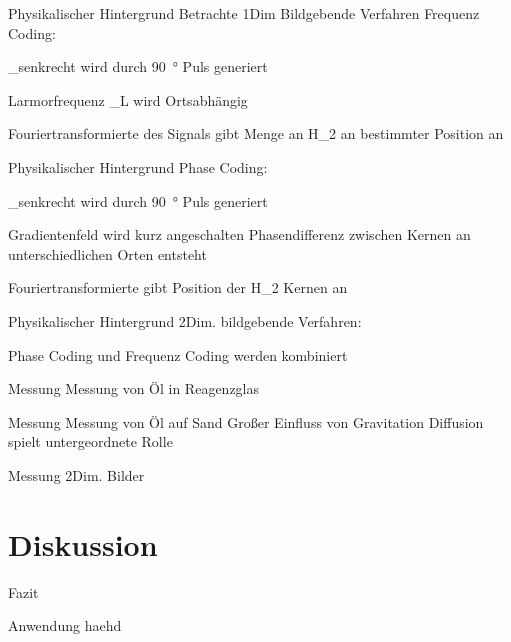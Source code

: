 \begin{frame}{Physikalischer Hintergrund}
Betrachte 1Dim Bildgebende Verfahren
Frequenz Coding:
	\item \M_{senkrecht} wird durch \SI{90}{\degree} Puls generiert
	\item Larmorfrequenz \omega_{L} wird Ortsabhängig
	\item Fouriertransformierte des Signals gibt Menge an H_{2} an bestimmter Position an
\end{frame}

\begin{frame}{Physikalischer Hintergrund}
Phase Coding:
	\item \M_{senkrecht} wird durch \SI{90}{\degree} Puls generiert
	\item Gradientenfeld wird kurz angeschalten
	\rightarrow Phasendifferenz zwischen Kernen an unterschiedlichen Orten entsteht
	\item Fouriertransformierte gibt Position der H_{2} Kernen an
\end{frame}

\begin{frame}{Physikalischer Hintergrund}
2Dim. bildgebende Verfahren:
	\item Phase Coding und Frequenz Coding werden kombiniert
\end{frame}

\begin{frame}{Messung}
Messung von Öl in Reagenzglas
\end{frame}

\begin{frame}{Messung}
Messung von Öl auf Sand
	\rightarrow Großer Einfluss von Gravitation
	\rightarrow Diffusion spielt untergeordnete Rolle
\end{frame}

\begin{frame}{Messung}
2Dim. Bilder
\end{frame}


\section{Diskussion}
\begin{frame}{Fazit}
\end{frame}

\begin{frame}{Anwendung}
haehd
\end{frame}